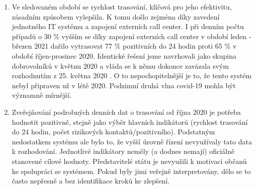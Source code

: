 \begin{enumerate}
\item Ve sledovaném období se rychlost trasování, klíčová pro jeho efektivitu, zásadním způsobem vylepšila. K tomu došlo zejména díky zavedení jednotného IT systému a zapojení externích call center. I při denním počtu případů o 30 \% vyšším se díky zapojení externích call center v období leden - březen 2021 dařilo vytrasovat 77 \% pozitivních do 24 hodin proti 65 \% v období říjen-prosinec 2020. Identické řešení jsme navrhovali jako skupina dobrovolníků v květnu 2020 \cite{tr_hlidac02} a vláda se k němu dokonce zavázala svým rozhodnutím z 25. května 2020 \cite{tr_vlada01}. O to nepochopitelnější je to, že tento systém nebyl připraven už v létě 2020. Podzimní druhá vlna covid-19 mohla být významně mírnější.
\item Zveřejňování podrobných denních dat o trasování od října 2020 je potřeba hodnotit pozitivně, stejně jako výběr hlavních indikátorů (rychlost trasování do 24 hodin, počet rizikových kontaktů/pozitivního). Podstatným nedostatkem systému ale bylo to, že vyšší úrovně řízení nevyužívaly tato data k rozhodování. Jednotlivé indikátory neměly (a dodnes nemají) oficiálně stanovené cílové hodnoty. Představitelé státu je nevyužili k motivaci občanů ke spolupráci se systémem. Pokud byly jimi veřejně interpretovány, dělo se to často nepřesně a bez identifikace kroků ke zlepšení.


\end{enumerate}
